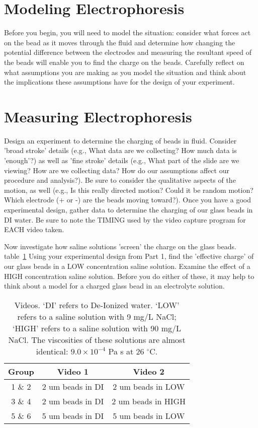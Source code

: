 \section{Modeling Electrophoresis}
Before you begin, you will need to model the situation: consider what forces act on the bead as it moves through the fluid and determine how changing the potential difference between the electrodes and measuring the resultant speed of the beads will enable you to find the charge on the beads. 
Carefully reflect on what assumptions you are making as you model the situation and think about the implications these assumptions have for the design of your experiment.

\section{Measuring Electrophoresis}
Design an experiment to determine the charging of beads in fluid. 
Consider 'broad stroke' details (e.g., What data are we collecting? How much data is 'enough'?) as well as 'fine stroke' details (e.g., What part of the slide are we viewing? How are we collecting data? How do our assumptions affect our procedure and analysis?). 
Be sure to consider the qualitative aspects of the motion, as well (e.g., Is this really directed motion? Could it be random motion? Which electrode (+ or -) are the beads moving toward?). 
Once you have a good experimental design, gather data to determine the charging of our glass beads in DI water. 
Be sure to note the TIMING used by the video capture program for EACH video taken.
\par 
Now investigate how saline solutions 'screen' the charge on the glass beads. 
table~\ref{lab8-vids}
Using your experimental design from Part 1, find the 'effective charge' of our glass beads in a LOW concentration saline solution. 
Examine the effect of a HIGH concentration saline solution. 
Before you do either of these, it may help to think about a model for a charged glass bead in an electrolyte solution.

\begin{table}[ht]
	\centering
	\begin{tabular}{|c|c|c|}
	\hline 
	\textbf{Group} & \textbf{Video 1} & \textbf{Video 2} \\ 
	\hline 
	1 \& 2 & 2 um beads in DI & 2 um beads in LOW \\ 
	\hline 
	3 \& 4 & 2 um beads in DI & 2 um beads in HIGH \\ 
	\hline 
	5 \& 6 & 5 um beads in DI & 5 um beads in LOW \\ 
	\hline 
	\end{tabular}
	\caption{Videos. `DI' refers to De-Ionized water. `LOW' refers to a saline solution with 9 mg/L NaCl; `HIGH' refers to a saline solution with 90 mg/L NaCl. The viscosities of these solutions are almost identical: $9.0 \times 10^{-4}$ Pa s at 26 $^{\circ}$C.}
	\label{lab8-vids}
\end{table} 